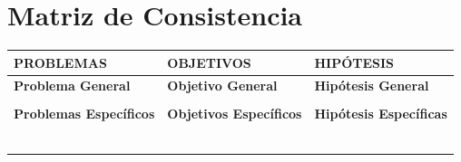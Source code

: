 	\section{Matriz de Consistencia}
	\label{anexo3}
	\begin{table}[h!]
		\centering
		\small
		\begin{tabular}{ |m{5.15cm}|m{5.15cm}|m{5.15cm}|  }
			\hline
			\Centering \textbf{PROBLEMAS}& \Centering \textbf{OBJETIVOS}& \Centering \textbf{HIPÓTESIS}\\
			\hline
			\Centering \textbf{Problema General}& \Centering \textbf{Objetivo General} & \Centering \textbf{Hipótesis General} \\
			\hline
			{\ProblemaGeneral} & { \ObjetivoGeneral} & {\HipotesisGeneral} \\
			\hline
			\Centering \textbf{Problemas Específicos}& \Centering \textbf{Objetivos Específicos} & \Centering \textbf{Hipótesis Específicas} \\
			\hline
			{\Pbone} & {\Objone} & {\Hone} \\
			\hline
			{\Pbtwo} & {\Objtwo} & {\Htwo} \\
			\hline
			{\Pbthree} & {\Objthree} & {\Hthree} \\
			\hline
			{\Pbfour} & {\Objfour} & {\Hfour} \\
			\hline
			{\Pbfive} & {\Objfive} & {\Hfive} \\
			\hline
			{\Pbsix} & {\Objsix} & {\Hsix} \\
			\hline
		\end{tabular}
	\end{table}
	\clearpage
	
